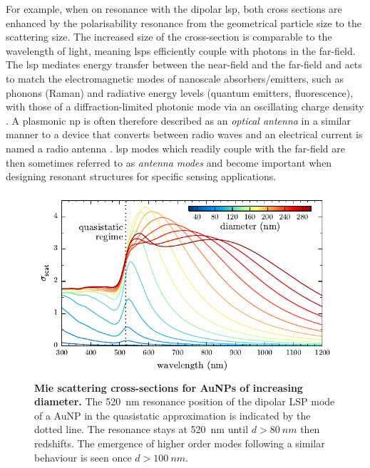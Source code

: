 \documentclass{article}
\begin{document}
For example, when on resonance with the dipolar \gls{lsp}, both cross sections are enhanced by the polarisability resonance from the geometrical particle size to the  scattering size. The increased size of the cross-section is comparable to the wavelength of light, meaning \glspl{lsp} efficiently couple with photons in the far-field. The \gls{lsp} mediates energy transfer between the near-field and the far-field and acts to match the electromagnetic modes of nanoscale absorbers/emitters, such as phonons (Raman) and radiative energy levels (quantum emitters, fluorescence), with those of a diffraction-limited photonic mode via an oscillating charge density \cite{berweger2012}. A plasmonic \gls{np} is often therefore described as an \textit{optical antenna} in a similar manner to a device that converts between radio waves and an electrical current is named a radio antenna \cite{bharadwaj2009, novotny2011}. \Gls{lsp} modes which readily couple with the far-field are then sometimes referred to as \emph{antenna modes} and become important when designing resonant structures for specific sensing applications.

\begin{figure}[bt]
\centering
\includegraphics{figures/mie_scattering}
\caption[Mie scattering cross-sections for AuNPs of increasing diameter]{\textbf{Mie scattering cross-sections for AuNPs of increasing diameter.} The \SI{520}{nm} resonance position of the dipolar LSP mode of a AuNP in the quasistatic approximation is indicated by the dotted line. The resonance stays at \SI{520}{nm} until $d>\SI{80}{nm}$ then redshifts. The emergence of higher order modes following a similar behaviour is seen once $d>\SI{100}{nm}$.}
\label{fig:mie_scattering}
\end{figure}
\end{document}
